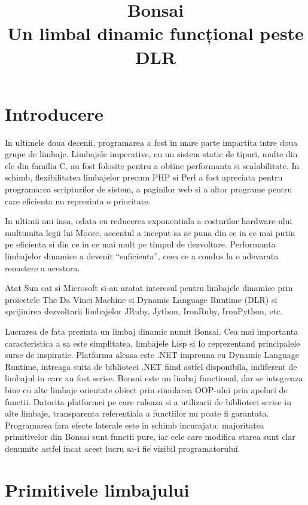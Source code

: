 \documentclass[12pt,a4paper]{memoir}
\title{Bonsai\\Un limbal dinamic funcțional peste DLR}
\begin{document}
\maketitle
\tableofcontents

\chapter{Introducere}

In ultimele doua decenii, programarea a fost in mare parte impartita intre doua grupe de limbaje. Limbajele imperative, cu un sistem static de tipuri, multe din ele din familia C, au fost folosite pentru a obtine performanta si scalabilitate. In schimb, flexibilitatea limbajelor precum PHP si Perl a fost apreciata pentru programarea scripturilor de sistem, a paginilor web si a altor programe pentru care eficienta nu reprezinta o prioritate.

In ultimii ani insa, odata cu reducerea exponentiala a costurilor hardware-ului multumita legii lui Moore, accentul a inceput sa se puna din ce in ce mai putin pe eficienta si din ce in ce mai mult pe timpul de dezvoltare. Performanta limbajelor dinamice a devenit ``suficienta'', ceea ce a condus la o adevarata renastere a acestora.

Atat Sun cat si Microsoft si-au aratat interesul pentru limbajele dinamice prin proiectele The Da Vinci Machine\cite{daVinciMachine} si Dynamic Language Runtime (DLR)\cite{dlr} si sprijinirea dezvoltarii limbajelor JRuby\cite{jruby}, Jython\cite{jython}, IronRuby\cite{ironruby}, IronPython\cite{ironpython}, etc.

Lucrarea de fata prezinta un limbaj dinamic numit Bonsai. Cea mai importanta caracteristica a sa este simplitatea, limbajele Lisp si Io \cite{io} reprezentand principalele surse de inspiratie. Platforma aleasa este .NET impreuna cu Dynamic Language Runtime, intreaga suita de biblioteci .NET fiind astfel disponibila, indiferent de limbajul in care au fost scrise. Bonsai este un limbaj functional, dar se integreaza bine cu alte limbaje orientate obiect prin simularea OOP-ului prin apeluri de functii. Datorita platformei pe care ruleaza si a utilizarii de biblioteci scrise in alte limbaje, transparenta referentiala a functiilor nu poate fi garantata. Programarea fara efecte laterale este in schimb incurajata: majoritatea primitivelor din Bonsai sunt functii pure, iar cele care modifica starea sunt clar
denumite astfel incat acest lucru sa-i fie vizibil programatorului.

\chapter{Primitivele limbajului}
\end{document}
